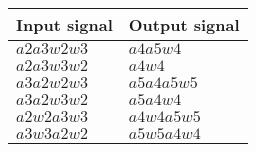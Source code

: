 \begin{center}
	\begin{tabular}{ || m{3cm}| m{3cm} || }
	\hline
	Input signal & Output signal\\
	\hline \hline
	$a2a3w2w3$ & $a4a5w4$ \\
	$a2a3w3w2$ & $a4w4$ \\
	$a3a2w2w3$ & $a5a4a5w5$ \\
	$a3a2w3w2$ & $a5a4w4$ \\
	$a2w2a3w3$ & $a4w4a5w5$ \\
	$a3w3a2w2$ & $a5w5a4w4$ \\
	\hline
	\end{tabular}
\end{center}

